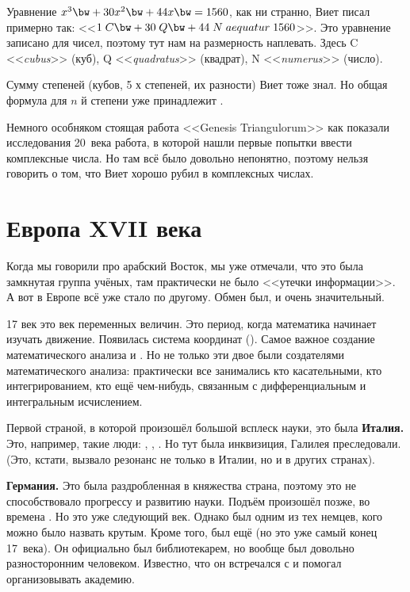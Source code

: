 \documentclass[a4paper,oneside,fleqn,10pt]{article}
\begin{document}
\begin{ex}
Уравнение $x^3 \bw+ 30 x^2 \bw+ 44 x \bw= 1560$, как ни странно, Виет писал примерно так:
<<$1\;C \bw+ 30\;Q \bw+ 44\;N\;aequatur\;1560$>>.
Это уравнение записано для чисел, поэтому тут нам на размерность наплевать.
Здесь C <<\emph{cubus}>> (куб), Q <<\emph{quadratus}>> (квадрат), N <<\emph{numerus}>> (число).
\end{ex}

Сумму степеней (кубов, 5 х степеней, их разности) Виет тоже знал.
Но общая формула для $n$ й степени уже принадлежит .

Немного особняком стоящая работа  <<Genesis Triangulorum>> как показали исследования
20~века работа, в которой нашли первые попытки ввести комплексные числа.
Но там всё было довольно непонятно, поэтому нельзя говорить о том, что Виет
хорошо рубил в комплексных числах.


\section{Европа XVII века}

Когда мы говорили про арабский Восток, мы уже отмечали, что это была замкнутая
группа учёных, там практически не было <<утечки информации>>.
А вот в Европе всё уже стало по другому. Обмен был, и очень значительный.

17 век это век переменных величин.
Это период, когда математика начинает изучать движение.
Появилась система координат (). Самое важное создание математического
анализа  и .
Но не только эти двое были создателями математического анализа:
практически все занимались
кто касательными, кто интегрированием, кто ещё чем-нибудь, связанным с
дифференциальным и интегральным исчислением.

Первой страной, в которой произошёл большой всплеск науки, это была \textbf{Италия.}
Это, например, такие люди: , , .
Но тут была инквизиция, Галилея преследовали.
(Это, кстати, вызвало резонанс не только в Италии, но и в других странах).

\textbf{Германия.} Это была раздробленная в княжества страна, поэтому это не способствовало
прогрессу и развитию науки. Подъём произошёл позже, во времена . Но это уже
следующий век. Однако  был одним из тех немцев, кого можно было назвать крутым.
Кроме того, был ещё  (но это уже самый конец 17~века).
Он официально был библиотекарем, но вообще был довольно
разносторонним человеком. Известно, что он встречался с 
и помогал организовывать академию.
\end{document}
